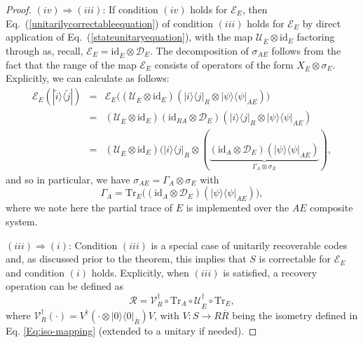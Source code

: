\documentclass[11pt]{amsart}
\theoremstyle{definition}
\theoremstyle{definition}
\theoremstyle{definition}
\newcommand{\mc}{\mathcal}
\newcommand{\tr}{\textrm{Tr}}
\newcommand{\id}{\textrm{id}}
\newcommand{\op}[2]{|#1\rangle\langle #2|}
\newcommand{\1}{\mathbb{I}}
\def\kb#1#2{|#1\rangle\!\langle #2 |}
\begin{document}
\begin{proof}
$(iv)\Rightarrow (iii)$: If condition $(iv)$ holds for $\mathcal E_E$, then Eq.~(\ref{unitarilycorrectableequation}) of condition $(iii)$ holds for $\mathcal E_E$ by direct application of Eq.~(\ref{stateunitaryequation}), with the map  $\mathcal U_{\overline{E}} \otimes \mathrm{id}_E$ factoring through as, recall, $\mathcal E_E = \mathrm{id}_{\overline{E}} \otimes \mathcal D_{E}$. The decomposition of $\sigma_{A E}$ follows from the fact that the range of the map $\mathcal E_E$ consists of operators of the form $X_{\overline{E}} \otimes \sigma_E$. Explicitly, we can calculate as follows: 
\begin{eqnarray*}
\mathcal E_E ( \kb{\widetilde{i}}{\widetilde{j}} ) &=& \mathcal E_E \big(  ( \mathcal U_{\overline{E}} \otimes \mathrm{id}_E ) ( \op{i}{j}_R\otimes\op{\psi}{\psi}_{AE}  )  \big) \\ 
    &=& ( \mathcal U_{\overline{E}} \otimes \mathrm{id}_E ) (\id_{RA} \otimes\mc{D}_E)(\op{i}{j}_R\otimes\op{\psi}{\psi}_{AE}) \\ 
    &=& ( \mathcal U_{\overline{E}} \otimes \mathrm{id}_E ) (\op{i}{j}_R\otimes ( \underbrace{(\id_{A} \otimes\mc{D}_E )(\op{\psi}{\psi}_{AE})}_{\Gamma_A \otimes \sigma_E}) , 
\end{eqnarray*}
and so in particular, we have $\sigma_{AE} = \Gamma_A \otimes \sigma_E$ with 
\[
\Gamma_A=\tr_E \big( ( \mathrm{id}_A \otimes \mathcal D_E )( \op{\psi}{\psi}_{AE} ) \big), 
\]
where we note here the partial trace of $E$ is implemented over the $AE$ composite system.  

$(iii)\Rightarrow (i)$: Condition $(iii)$ is a special case of unitarily recoverable codes and, as discussed prior to the theorem, this implies that $S$ is correctable for $\mathcal E_E$ and condition $(i)$ holds. Explicitly, when $(iii)$ is satisfied, a recovery operation can be defined as 
\[
\mathcal R =  \mathcal V_R^\dagger \circ \tr_{A} \circ \mathcal U_{\overline{E}}^\dagger \circ \tr_E, 
\]
where $\mc{V}_R^\dagger(\cdot)=V^\dagger(\cdot\otimes \op{0}{0}_{\overline{R}})V$, with $V:S\to R\overline{R}$ being the isometry defined in Eq. \eqref{Eq:iso-mapping} (extended to a unitary if needed).




\end{proof}
\end{document}
